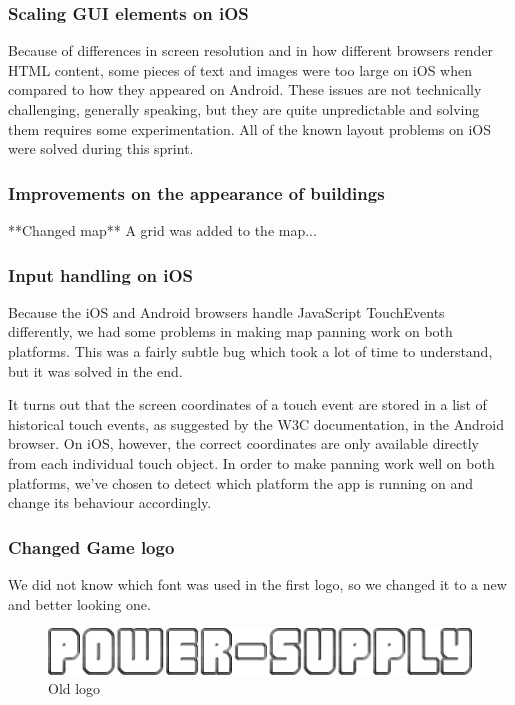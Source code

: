 	\subsubsection*{Scaling GUI elements on iOS}
		Because of differences in screen resolution and in how different browsers
		render HTML content, some pieces of text and images were too large on iOS
		when compared to how they appeared on Android. These issues are not
		technically challenging, generally speaking, but they are quite
		unpredictable and solving them requires some experimentation. All of the
		known layout problems on iOS were solved during this sprint.

	\subsubsection*{Improvements on the appearance of buildings}
		**Changed map**
		A grid was added to the map...

	\subsubsection*{Input handling on iOS}
		Because the iOS and Android browsers handle JavaScript TouchEvents
		differently, we had some problems in making map panning work on both
		platforms. This was a fairly subtle bug which took a lot of time to
		understand, but it was solved in the end.

		It turns out that the screen coordinates of a touch event are stored in
		a list of historical touch events, as suggested by the W3C
		documentation\cite{touchEventDocumentation}, in the Android browser.
		On iOS, however, the correct coordinates are only available directly from
		each individual touch object. In order to make panning work well on both
		platforms, we've chosen to detect which platform the app is running on
		and change its behaviour accordingly.

	\subsubsection*{Changed Game logo}
		We did not know which font was used in the first logo, so we changed it to a new
		and better looking one. 

		\begin{figure}
			\centering
			\includegraphics[scale=0.4]{pictures/logo2.png}
			\caption{Old logo}
		\end{figure}

